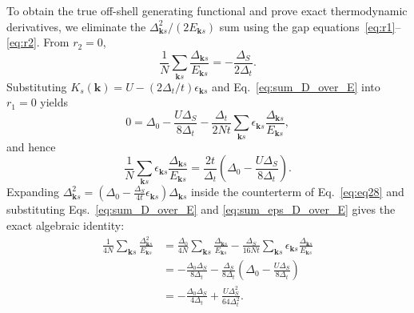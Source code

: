 \documentclass[aps,prb,twocolumn,superscriptaddress,longbibliography,floatfix]{revtex4-2}
\newcommand{\ks}{\mathbf{k}s}
\begin{document}
To obtain the true off-shell generating functional and prove exact thermodynamic derivatives, we eliminate the $\Delta_{\ks}^2/(2E_{\ks})$ sum using the gap equations~\eqref{eq:r1}--\eqref{eq:r2}. From $r_2=0$,
\begin{equation}
\frac{1}{N}\sum_{\ks}\frac{\Delta_{\ks}}{E_{\ks}} = -\frac{\Delta_S}{2\Delta_t}.
\label{eq:sum_D_over_E}
\end{equation}
Substituting $K_s(\mathbf{k}) = U - (2\Delta_t/t)\epsilon_{\ks}$ and Eq.~\eqref{eq:sum_D_over_E} into $r_1=0$ yields
\begin{equation}
0 = \Delta_0 - \frac{U\Delta_S}{8\Delta_t} - \frac{\Delta_t}{2Nt}\sum_{\ks}\epsilon_{\ks}\frac{\Delta_{\ks}}{E_{\ks}},
\end{equation}
and hence
\begin{equation}
\frac{1}{N}\sum_{\ks}\epsilon_{\ks}\frac{\Delta_{\ks}}{E_{\ks}} = \frac{2t}{\Delta_t}\left(\Delta_0 - \frac{U\Delta_S}{8\Delta_t}\right).
\label{eq:sum_eps_D_over_E}
\end{equation}
Expanding $\Delta_{\ks}^2 = (\Delta_0 - \frac{\Delta_S}{4t}\epsilon_{\ks})\Delta_{\ks}$ inside the counterterm of Eq.~\eqref{eq:eq28} and substituting Eqs.~\eqref{eq:sum_D_over_E} and \eqref{eq:sum_eps_D_over_E} gives the exact algebraic identity:
\begin{align}
\frac{1}{4N}\sum_{\ks}\frac{\Delta_{\ks}^2}{E_{\ks}}
&= \frac{\Delta_0}{4N}\sum_{\ks}\frac{\Delta_{\ks}}{E_{\ks}} - \frac{\Delta_S}{16Nt}\sum_{\ks}\epsilon_{\ks}\frac{\Delta_{\ks}}{E_{\ks}} \nonumber\\
&= -\frac{\Delta_0\Delta_S}{8\Delta_t} - \frac{\Delta_S}{8\Delta_t}\left(\Delta_0 - \frac{U\Delta_S}{8\Delta_t}\right) \nonumber\\
&= -\frac{\Delta_0\Delta_S}{4\Delta_t} + \frac{U\Delta_S^2}{64\Delta_t^2}.
\label{eq:counterterm_identity}
\end{align}
\end{document}
